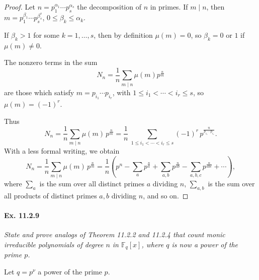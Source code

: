 \documentclass[11pt,a4paper]{article}
\newcommand{\F}{\mathbb{F}}
\begin{document}
\begin{proof}
Let $n = p_1^{\alpha_1}\cdots p_s^{\alpha_s}$ the decomposition of $n$ in primes.
If $m\mid n$, then $m = p_1^{\beta_1}\cdots p_s^{\beta_s^s}$, $0\leq \beta_k \leq \alpha_k$.

If $\beta_k>1$ for some $k=1,\ldots,s$, then by definition $\mu(m)=0$, so $\beta_k = 0$ or $1$ if $\mu(m) \neq 0$.

The nonzero terms in the sum $$N_n = \frac{1}{n} \sum_{m\mid n} \mu(m) p^{\frac{n}{m}}$$ are those which satisfy $m = p_{i_1}\cdots p_{i_r}$, with $1\leq i_1<\cdots < i_r \leq s$, so $\mu(m) = (-1)^r$.

Thus
$$N_n = \frac{1}{n} \sum_{m\mid n} \mu(m)\,  p^{\frac{n}{m}} =  \frac{1}{n} \ \sum_{1\leq i_1<\cdots < i_r \leq s} (-1)^r\,  p^{\frac{n}{p_{i_1}\cdots p_{i_r}}}.$$
With a less formal writing, we obtain
$$N_n = \frac{1}{n} \sum_{m\mid n} \mu(m)\,  p^{\frac{n}{m}} = \frac{1}{n}\left(p^n - \sum_{a} p^{\frac{n}{a}} + \sum_{a,b} p^{\frac{n}{ab}} - \sum_{a,b,c} p^{\frac{n}{abc}}+\cdots \right),$$
where $\sum_a$ is the sum over all distinct primes $a$ dividing $n$, $\sum_{a,b}$ is the sum over all products of distinct primes $a,b$ dividing $n$, and so on.
\end{proof}

\paragraph{Ex. 11.2.9}

{\it State and prove analogs of Theorem 11.2.2 and 11.2.4 that count monic irreducible polynomials of degree $n$ in $\F_q[x]$, where $q$ is now a power of the prime $p$.
}

\bigskip

Let $q=p^{\nu}$ a power of the prime $p$.

\bigskip
\end{document}
